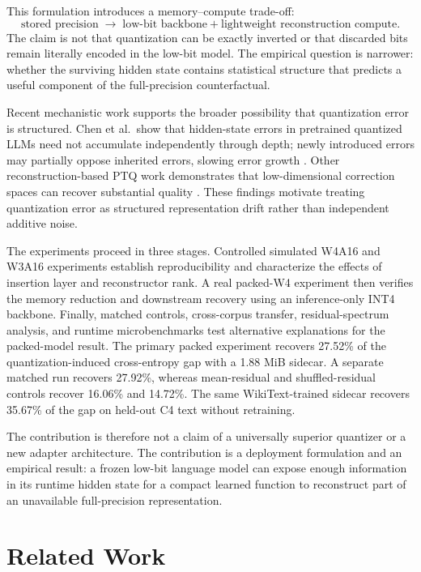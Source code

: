 \documentclass[11pt]{article}
\begin{document}
This formulation introduces a memory--compute trade-off:
\begin{equation}
 \text{stored precision}
 \;\longrightarrow\;
 \text{low-bit backbone} + \text{lightweight reconstruction compute}.
\end{equation}
The claim is not that quantization can be exactly inverted or that discarded bits remain literally encoded in the low-bit model. The empirical question is narrower: whether the surviving hidden state contains statistical structure that predicts a useful component of the full-precision counterfactual.

Recent mechanistic work supports the broader possibility that quantization error is structured. Chen et al.\ show that hidden-state errors in pretrained quantized LLMs need not accumulate independently through depth; newly introduced errors may partially oppose inherited errors, slowing error growth \cite{chen2026why}. Other reconstruction-based PTQ work demonstrates that low-dimensional correction spaces can recover substantial quality \cite{zhang2024lqer,zhang2025qera,zhao2025aser,an2026glowq,fan2026balancer}. These findings motivate treating quantization error as structured representation drift rather than independent additive noise.

The experiments proceed in three stages. Controlled simulated W4A16 and W3A16 experiments establish reproducibility and characterize the effects of insertion layer and reconstructor rank. A real packed-W4 experiment then verifies the memory reduction and downstream recovery using an inference-only INT4 backbone. Finally, matched controls, cross-corpus transfer, residual-spectrum analysis, and runtime microbenchmarks test alternative explanations for the packed-model result. The primary packed experiment recovers 27.52\% of the quantization-induced cross-entropy gap with a 1.88 MiB sidecar. A separate matched run recovers 27.92\%, whereas mean-residual and shuffled-residual controls recover 16.06\% and 14.72\%. The same WikiText-trained sidecar recovers 35.67\% of the gap on held-out C4 text without retraining.

The contribution is therefore not a claim of a universally superior quantizer or a new adapter architecture. The contribution is a deployment formulation and an empirical result: a frozen low-bit language model can expose enough information in its runtime hidden state for a compact learned function to reconstruct part of an unavailable full-precision representation.

\section{Related Work}
\end{document}
